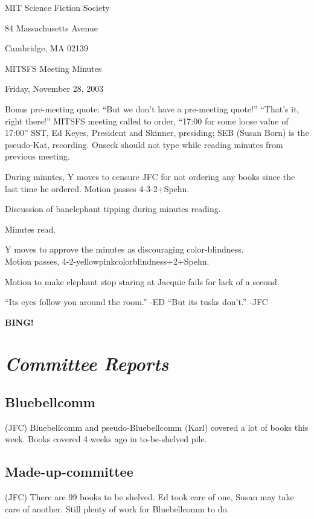 \documentclass[10pt]{article}
\newcommand{\bing}{{\bf BING!} }
\newcommand{\goto}[1]{\bing \vskip 12pt \section*{{\em{#1}}}}
\begin{document}
\begin{center}

MIT Science Fiction Society 

84 Massachusetts Avenue

Cambridge, MA 02139

\vspace{12pt}

MITSFS Meeting Minutes 

Friday, November 28, 2003

\end{center}
 
\vspace{18pt}

\setlength{\parskip}{6pt}
Bonus pre-meeting quote: ``But we don't have a pre-meeting quote!''
``That's it, right there!''
\noindent
MITSFS meeting called to order, ``17:00 for some loose value of 17:00''
SST, Ed Keyes, President and Skinner, presiding; SEB (Susan Born) is
the pseudo-Kat, recording.
Onseck should not type while reading minutes from previous meeting.

During minutes, Y moves to censure JFC for not ordering any books since
the last time he ordered.  Motion passes 4-3-2+Spehn.

Discussion of banelephant tipping during minutes reading.

Minutes read.

Y moves to approve the minutes as discouraging color-blindness.\\
Motion passes, 4-2-yellowpinkcolorblindness+2+Spehn.

Motion to make elephant stop staring at Jacquie fails for lack of a second.

``Its eyes follow you around the room.'' -ED
``But its tusks don't.'' -JFC

\goto{Committee Reports}
\subsection*{Bluebellcomm}(JFC) 
Bluebellcomm and pseudo-Bluebellcomm (Karl) covered a lot of books
this week.  Books covered 4 weeks ago in to-be-shelved pile.

\subsection*{Made-up-committee}(JFC)
 There are 99 books to be shelved.  Ed took
care of one, Susan may take care of another.  Still plenty of work for
Bluebellcomm to do.
\end{document}
